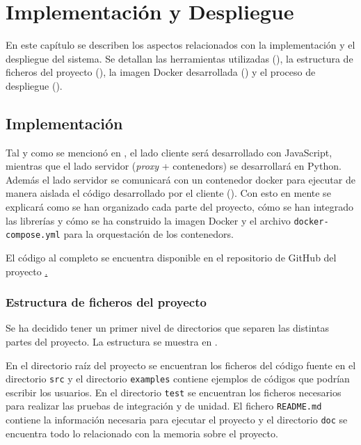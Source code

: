 \chapter{Implementación y Despliegue}\label{chap:implementacion_y_despliegue}
En este capítulo se describen los aspectos relacionados con la implementación y el despliegue del sistema. Se detallan las herramientas utilizadas (), la estructura de ficheros del proyecto (), la \gls{imagen Docker} desarrollada () y el proceso de despliegue ().

\section{Implementación} \label{sec:implementacion}
Tal y como se mencionó en , el lado cliente será desarrollado con JavaScript, mientras que el lado servidor (\textit{\gls{proxy}} + \glspl{contenedor}) se desarrollará en Python. Además el lado servidor se comunicará con un \gls{contenedor} docker para ejecutar de manera aislada el código desarrollado por el cliente (). Con esto en mente se explicará como se han organizado cada parte del proyecto, cómo se han integrado las librerías y cómo se ha construido la \gls{imagen Docker} y el archivo \texttt{docker-compose.yml} para la orquestación de los \glspl{contenedor}.


El código al completo se encuentra disponible en el repositorio de GitHub del proyecto \href{https://github.com/Adri-Extremix/Trabajo-de-Fin-de-Grado}.

\subsection{Estructura de ficheros del proyecto}\label{subsec:estructura_ficheros_proyecto}

Se ha decidido tener un primer nivel de directorios que separen las distintas partes del proyecto. La estructura se muestra en .   
\begin{figure}[H]
    {
    \begin{tcolorbox}
    \end{tcolorbox}
    }
\end{figure}
En el directorio raíz del proyecto se encuentran los ficheros del \gls{código fuente} en el directorio \texttt{src} y el directorio \texttt{examples} contiene ejemplos de códigos que podrían escribir los usuarios. En el directorio \texttt{test} se encuentran los ficheros necesarios para realizar las pruebas de integración y de unidad. El fichero \texttt{README.md} contiene la información necesaria para ejecutar el proyecto y el directorio \texttt{doc} se encuentra todo lo relacionado con la memoria sobre el proyecto.

